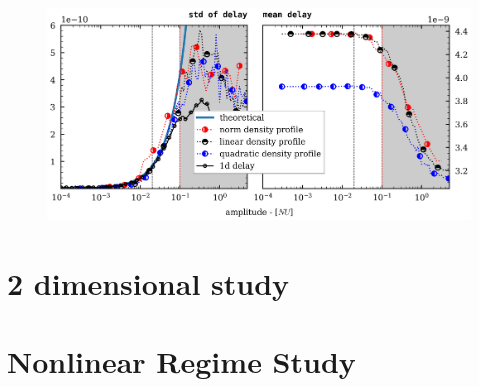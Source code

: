 \documentclass[11pt,a4paper]{report}
\begin{document}
\begin{figure}[H]
    \centering
    \includegraphics[width=1\linewidth]{./figures/delay_amp_norm_2.png}
    \caption{}
    \label{fig:barrier}
\end{figure}
\begin{multicols}{2}



    \section{2 dimensional study}

    \section{Nonlinear Regime Study}

\end{multicols}
\newpage
\end{document}
